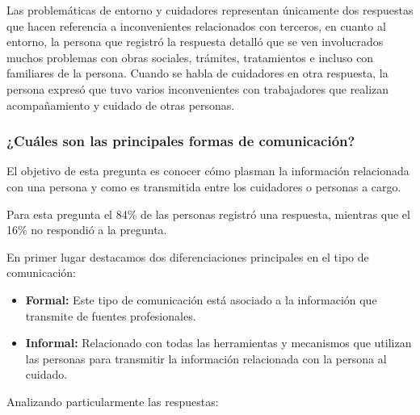 \documentclass[a4paper,12pt]{article}
\newcommand{\saltolinea}{\par\vspace{\baselineskip}}
\begin{document}
    \par Las problemáticas de entorno y cuidadores representan únicamente dos respuestas que hacen referencia a inconvenientes relacionados con terceros, en cuanto al entorno, la persona que registró la respuesta detalló que se ven involucrados muchos problemas con obras sociales, trámites, tratamientos e incluso con familiares de la persona. Cuando se habla de cuidadores en otra respuesta, la persona expresó que tuvo varios inconvenientes con trabajadores que realizan acompañamiento y cuidado de otras personas.
    \subsubsection{¿Cuáles son las principales formas de comunicación?}
    \par El objetivo de esta pregunta es conocer cómo plasman la información relacionada con una persona y como es transmitida entre los cuidadores o personas a cargo.
    \par Para esta pregunta el 84\% de las personas registró una respuesta, mientras que el 16\% no respondió a la pregunta. 
    \newline
    \saltolinea
    \par En primer lugar destacamos dos diferenciaciones principales en el tipo de comunicación:
    \begin{itemize}
        \item \textbf{Formal:} Este tipo de comunicación está asociado a la información que transmite de fuentes profesionales.
        \item \textbf{Informal:} Relacionado con todas las herramientas y mecanismos que utilizan las personas para transmitir la información relacionada con la persona al cuidado.
    \end{itemize}
    \par Analizando particularmente las respuestas:
\end{document}
